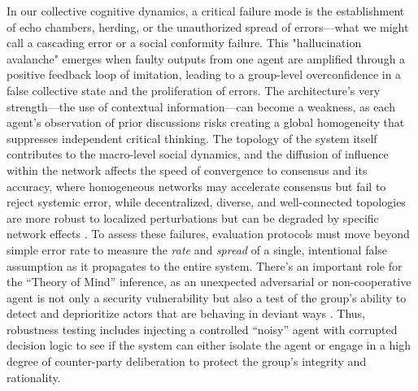 \documentclass[11pt,a4paper]{article}
\begin{document}
In our collective cognitive dynamics, a critical failure mode is the establishment of echo chambers, herding, or the unauthorized spread of errors---what we might call a cascading error or a social conformity failure. This "hallucination avalanche" emerges when faulty outputs from one agent are amplified through a positive feedback loop of imitation, leading to a group-level overconfidence in a false collective state and the proliferation of errors. The architecture's very strength---the use of contextual information---can become a weakness, as each agent's observation of prior discussions risks creating a global homogeneity that suppresses independent critical thinking. The topology of the system itself contributes to the macro-level social dynamics, and the diffusion of influence within the network affects the speed of convergence to consensus and its accuracy, where homogeneous networks may accelerate consensus but fail to reject systemic error, while decentralized, diverse, and well-connected topologies are more robust to localized perturbations but can be degraded by specific network effects \cite{arxiv:1507.03826v1,arxiv:2406.07155v1}. To assess these failures, evaluation protocols must move beyond simple error rate to measure the \emph{rate} and \emph{spread} of a single, intentional false assumption as it propagates to the entire system. There's an important role for the ``Theory of Mind'' inference, as an unexpected adversarial or non-cooperative agent is not only a security vulnerability but also a test of the group's ability to detect and deprioritize actors that are behaving in deviant ways \cite{arxiv:1901.06085v1}. Thus, robustness testing includes injecting a controlled ``noisy'' agent with corrupted decision logic to see if the system can either isolate the agent or engage in a high degree of counter-party deliberation to protect the group's integrity and rationality.
\end{document}
